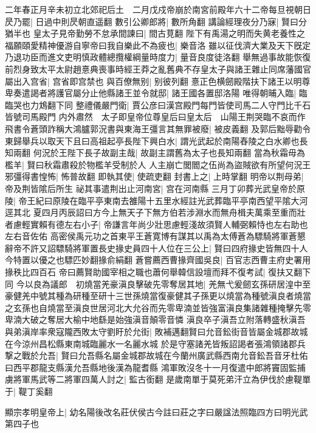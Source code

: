二年春正月辛未初立北郊祀后土　二月戊戍帝崩於南宮前殿年六十二帝每旦視朝日昃乃罷|{
	日過中則昃朝直遥翻}
數引公卿郎將|{
	數所角翻}
講論經理夜分乃寐|{
	賢曰分猶半也}
皇太子見帝勤勞不怠承間諫曰|{
	間古莧翻}
陛下有禹湯之明而失黄老養性之福願頤愛精神優游自寧帝曰我自樂此不為疲也|{
	樂音洛}
雖以征伐濟大業及天下旣定乃退功臣而進文吏明慎政體總攬權綱量時度力|{
	量音良度徒洛翻}
舉無過事故能恢復前烈身致太平太尉趙憙典喪事時經王莽之亂舊典不存皇太子與諸王雜止同席藩國官屬出入宫省|{
	宫省即宫禁也}
與百僚無别|{
	别彼列翻}
憙正色横劒殿階扶下諸王以明尊卑奏遣謁者將護官屬分止他縣諸王並令就邸|{
	諸王國各置邸洛陽}
唯得朝晡入臨|{
	臨臨哭也力鴆翻下同}
整禮儀嚴門衛|{
	賈公彦曰漢宫殿門每門皆使司馬二人守門比千石皆號司馬殿門}
内外肅然　太子即皇帝位尊皇后曰皇太后　山陽王荆哭臨不哀而作飛書令蒼頭詐稱大鴻臚郭況書與東海王彊言其無罪被廢|{
	被皮義翻}
及郭后黜辱勸令東歸舉兵以取天下且曰高祖起亭長陛下興白水|{
	謂光武起於南陽舂陵之白水卿也長知兩翻}
何況於王陛下長子故副主哉|{
	故副主謂舊為太子也長知兩翻}
當為秋霜毋為檻羊|{
	賢曰秋霜肅殺於物檻羊受制於人}
人主崩亡閭閻之伍尚為盜賊欲有所望何況王邪彊得書惶怖|{
	怖普故翻}
即執其使|{
	使疏吏翻}
封書上之|{
	上時掌翻}
明帝以荆母弟|{
	帝及荆皆隂后所生}
祕其事遣荆出止河南宮|{
	宫在河南縣}
三月丁卯葬光武皇帝於原陵|{
	帝王紀曰原陵在臨平亭東南去雒陽十五里水經註光武葬臨平亭南西望平隂大河逕其北}
夏四月丙辰詔曰方今上無天子下無方伯若涉淵水而無舟楫夫萬乘至重而壯者慮輕實賴有德左右小子|{
	帝謙言年尚少壯思慮輕淺故須賢人輔弼賴恃也左右助也左右音佐佑}
高密侯禹元功之首東平王蒼寛博有謀其以禹為太傅蒼為驃騎將軍蒼懇辭帝不許又詔驃騎將軍置長史掾史員四十人位在三公上|{
	賢曰四府掾史皆無四十人今特置以優之也驃匹妙翻掾俞絹翻}
蒼嘗薦西曹掾齊國吳良|{
	百官志西曹主府史署用掾秩比四百石}
帝曰薦賢助國宰相之職也蕭何舉韓信設壇而拜不復考試|{
	復扶又翻下同}
今以良為議郎　初燒當羌豪滇良擊破先零奪居其地|{
	羌無弋爰劒玄孫研居湟中至豪健羌中號其種為研種至研十三世孫燒當復豪健其子孫更以燒當為種號滇良者燒當之玄孫也自燒當至滇良世居河北大允谷而先零卑湳並皆強富滇良集諸雜種掩擊先零卑湳大破之奪居大榆中地繇是始強滇音顛零音憐}
滇良卒子滇吾立附落轉盛秋滇吾與弟滇岸率衆寇隴西敗太守劉盱於允街|{
	敗補邁翻賢曰允音鈆街音皆屬金城郡故城在今涼州昌松縣東南城臨麗水一名麗水城}
於是守塞諸羌皆叛詔謁者張鴻領諸郡兵撃之戰於允吾|{
	賢曰允吾縣名屬金城郡故城在今蘭州廣武縣西南允音鈆吾音牙杜佑曰西平郡龍支縣漢允吾縣地後漢為龍耆縣}
鴻軍敗沒冬十一月復遣中郎將竇固監捕虜將軍馬武等二將軍四萬人討之|{
	監古銜翻}
是歲南單于莫死弟汗立為伊伐於慮鞮單于|{
	鞮丁奚翻}


顯宗孝明皇帝上|{
	幼名陽後改名莊伏侯古今註曰莊之字曰嚴諡法照臨四方曰明光武第四子也}


